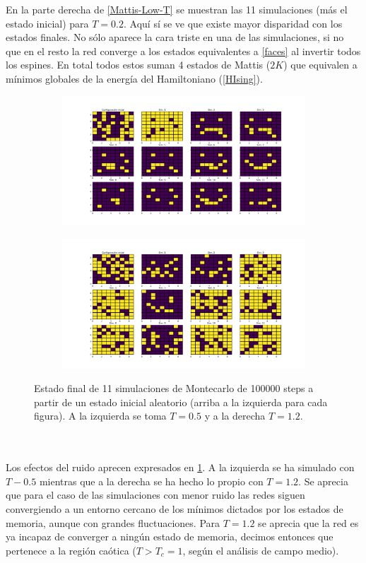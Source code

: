 \documentclass[titlepage,12pt]{article}
\numberwithin{equation}{section}
\begin{document}
	En la parte derecha de \ref{Mattis-Low-T} se muestran las 11 simulaciones (más el estado inicial) para $T = 0.2$. Aquí sí se ve que existe mayor disparidad con los estados finales. No sólo aparece la cara triste en una de las simulaciones, si no que en el resto la red converge a los estados equivalentes a \ref{faces} al invertir todos los espines. En total todos estos suman 4 estados de Mattis ($2K$) que equivalen a mínimos globales de la energía del Hamiltoniano (\ref{HIsing}).
	\begin{figure}
	    \centering
	    \begin{subfigure}{.45\textwidth}
	    \centering
	    \includegraphics[width=\linewidth]{9x9_T=0,5.png}
	    \end{subfigure}%
	    \begin{subfigure}{.45\linewidth}
	    \centering
	    \includegraphics[width=\linewidth]{9x9_T=1,2.png}
	    \end{subfigure}%
	    \caption{Estado final de 11 simulaciones de Montecarlo de 100000 steps a partir de un estado inicial aleatorio (arriba a la izquierda para cada figura). A la izquierda se toma $T = 0.5$ y a la derecha $T = 1.2$.}
	    \label{Mattis-High-T}
	\end{figure}
	\\
	\\
	Los efectos del ruido aprecen expresados en \ref{Mattis-High-T}. A la izquierda se ha simulado con $T - 0.5$ mientras que a la derecha se ha hecho lo propio con $T = 1.2$. Se aprecia que para el caso de las simulaciones con menor ruido las redes siguen convergiendo a un entorno cercano de los mínimos dictados por los estados de memoria, aunque con grandes fluctuaciones. Para  $T = 1.2$ se aprecia que la red es ya incapaz de converger a ningún estado de memoria, decimos entonces que pertenece a la región caótica ($T > T_{c} = 1$, según el análisis de campo medio).
\end{document}
